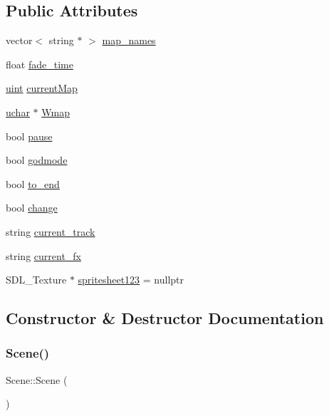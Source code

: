 \subsection*{Public Attributes}
\begin{DoxyCompactItemize}
\item 
vector$<$ string $\ast$ $>$ \mbox{\hyperlink{class_scene_a2df3ce0c62300ee9fbcb9b2934f78448}{map\+\_\+names}}
\item 
float \mbox{\hyperlink{class_scene_acb3dbbaf6cb1357c88b92988e1be8296}{fade\+\_\+time}}
\item 
\mbox{\hyperlink{_defs_8h_a91ad9478d81a7aaf2593e8d9c3d06a14}{uint}} \mbox{\hyperlink{class_scene_af3b1640b90ba8f3e8776ff9de12e50c6}{current\+Map}}
\item 
\mbox{\hyperlink{_defs_8h_a65f85814a8290f9797005d3b28e7e5fc}{uchar}} $\ast$ \mbox{\hyperlink{class_scene_a09d698a912b724c33dcb55fcde2fad0e}{Wmap}}
\item 
bool \mbox{\hyperlink{class_scene_a140d39ea291abd069dad5bf6bff97e37}{pause}}
\item 
bool \mbox{\hyperlink{class_scene_ad1f66b859c86d5f6613fa1ce55cf4aa6}{godmode}}
\item 
bool \mbox{\hyperlink{class_scene_af466fd52e34090cca30013892cf9eda1}{to\+\_\+end}}
\item 
bool \mbox{\hyperlink{class_scene_ab88fa0069665871b5c8573ddacf7e538}{change}}
\item 
string \mbox{\hyperlink{class_scene_a4efd322c48ab336dab650ec8096b18a7}{current\+\_\+track}}
\item 
string \mbox{\hyperlink{class_scene_a6c718a700913a1a705606f868bba3910}{current\+\_\+fx}}
\item 
S\+D\+L\+\_\+\+Texture $\ast$ \mbox{\hyperlink{class_scene_a34cfa6c0ab6e07b2413ea3ebdcadc878}{spritesheet123}} = nullptr
\end{DoxyCompactItemize}


\subsection{Constructor \& Destructor Documentation}
\mbox{\label{class_scene_ad10176d75a9cc0da56626f682d083507}} 
\subsubsection{\texorpdfstring{Scene()}{Scene()}}
{\footnotesize\ttfamily Scene\+::\+Scene (\begin{DoxyParamCaption}{ }\end{DoxyParamCaption})}

